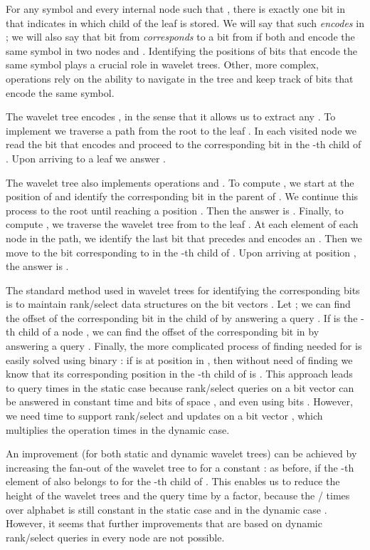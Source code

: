 \documentclass[11pt]{article}
\begin{document}
For any  symbol  and  every internal node  such that , 
there is exactly one bit  in  that indicates in which child 
of   the leaf  is stored. We will say that such  
\emph{encodes}  in ; we will also say that bit  from  
\emph{corresponds} to a bit  from  if both  and  encode 
the same symbol  in two nodes  and . 
Identifying the positions of bits that encode the same 
symbol plays a crucial role in wavelet trees. Other, more complex, 
operations rely on the ability to navigate in the tree and keep track of 
bits that encode the same symbol.

The wavelet tree encodes , in the sense that it allows us to extract any
. To implement  we traverse a path from the root to the leaf 
. In each visited node we read the bit  that encodes  and 
proceed to the corresponding bit in the -th child of . Upon arriving 
to a leaf  we answer . 

The wavelet tree also implements operations  and .
To compute , we start at the position of  and 
identify the corresponding bit  in the parent  of . We continue
this process to the root until reaching a position . Then the answer
is .
Finally, to compute , we traverse the wavelet tree from 
to the leaf . At each element  of each node  in the path, 
we identify the last bit  that precedes  and encodes an . Then we
move to the bit  corresponding to  in the -th child of . Upon
arriving at position , the answer is .


The standard method used in wavelet trees for identifying
 the corresponding bits 
is to maintain rank/select data structures on the bit vectors . 
Let ; we can find the offset of the 
corresponding bit in the child of  by answering a query .
If  is the -th child of a node , we can find the offset of the
corresponding bit in  by answering a query . Finally, the
more complicated process of finding  needed for  is easily
solved using binary : if  is at position  in , then without 
need of finding  we know that its corresponding position in the -th 
child of  is .
This approach leads to  query times in the static case because 
rank/select queries on a bit vector  can be answered in constant time
and  bits of space \cite{Mun96,Cla96}, and even using 
 bits \cite{RRR07}. 
However, we need  time to support rank/select and
updates on a bit vector \cite{FS89}, which multiplies the operation times in
the dynamic case. 

An improvement (for both static and dynamic wavelet trees) can be achieved by increasing the fan-out of the wavelet tree to  for a constant : as before,  if the -th element
of  also belongs to  for the -th child  of . 
This enables us to reduce the height of the wavelet trees and the 
query time by a  factor, because the / times
over alphabet  is still constant in the static case \cite{FMMN07}
and  in the dynamic case \cite{HM10,NS10}. 
However, it seems that further improvements that are based on dynamic rank/select queries 
in every node are not possible.
\end{document}

